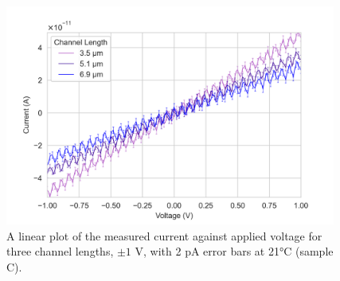 \begin{figure}[h]
    \centering
    \includegraphics[width=0.97\textwidth]{Appendix1/1V IV characteristics at 21 C.png}
    \caption{A linear plot of the measured current against applied voltage for three channel lengths, $\pm1$ \si{\volt}, with 2 \si{\pico\ampere} error bars at 21\si{\degreeCelsius} (sample C).}
    \label{fig:1V_C_current_voltage_21}
\end{figure}

